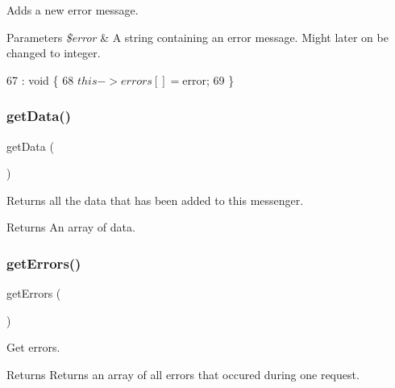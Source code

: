 Adds a new error message. 
\begin{DoxyParams}{Parameters}
{\em \$error} & A string containing an error message. Might later on be changed to integer. \\
\hline
\end{DoxyParams}

\begin{DoxyCode}
67                                           : \textcolor{keywordtype}{void} \{
68         $this->errors [] = $error;
69     \}
\end{DoxyCode}
\mbox{\label{class_lora_1_1_messenger_a81a67162a6288d78fc4c55283325f0b4}} 
\subsubsection{\texorpdfstring{get\+Data()}{getData()}}
{\footnotesize\ttfamily get\+Data (\begin{DoxyParamCaption}{ }\end{DoxyParamCaption})}

Returns all the data that has been added to this messenger. \begin{DoxyReturn}{Returns}
An array of data. 
\end{DoxyReturn}

\mbox{\label{class_lora_1_1_messenger_a6e548ebf2656742bfd19939ead923ed2}} 
\subsubsection{\texorpdfstring{get\+Errors()}{getErrors()}}
{\footnotesize\ttfamily get\+Errors (\begin{DoxyParamCaption}{ }\end{DoxyParamCaption})}

Get errors. \begin{DoxyReturn}{Returns}
Returns an array of all errors that occured during one request. 
\end{DoxyReturn}

